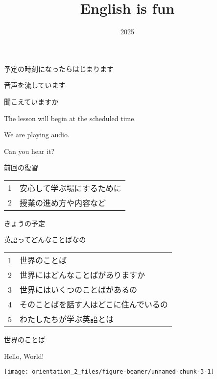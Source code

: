 \documentclass[
  ignorenonframetext,
  aspectratio=169,
  xcolor=dvipsnames]{beamer}
\title{English is fun}
\author{}
\date{\vspace{-2.5em}2025}
\begin{document}
\frame{\titlepage}

\begin{frame}{}
\label{section}
\thispagestyle{empty}
\Large

\raggedright

予定の時刻になったらはじまります

\textbullet  音声を流しています

\textbullet  聞こえていますか　

\vfill

\raggedleft

The lesson will begin at the scheduled time.

\vspace{-6pt}

We are playing audio.

\vspace{-6pt}

Can you hear it?
\end{frame}

\begin{frame}{}
\label{section-1}
\thispagestyle{empty}
\titlepage
\end{frame}

\begin{frame}{前回の復習}
\label{ux524dux56deux306eux5fa9ux7fd2}
\thispagestyle{empty}
\LARGE

\begin{tabular}{rl}
1&安心して学ぶ場にするために\\
2&授業の進め方や内容など
\end{tabular}
\end{frame}

\begin{frame}{きょうの予定}
\label{ux304dux3087ux3046ux306eux4e88ux5b9a}
\thispagestyle{empty}
\LARGE

英語ってどんなことばなの

\bigskip

\Large
\begin{tabular}{rl}
1&世界のことば\\
2&世界にはどんなことばがありますか\\
3&世界にはいくつのことばがあるの\\
4&そのことばを話す人はどこに住んでいるの\\
5&わたしたちが学ぶ英語とは
\end{tabular}
\end{frame}

\begin{frame}{世界のことば}
\label{ux4e16ux754cux306eux3053ux3068ux3070}
\Large

Hello, World!

\texttt{[image: orientation\_2\_files/figure-beamer/unnamed-chunk-3-1]}
\end{frame}
\end{document}
